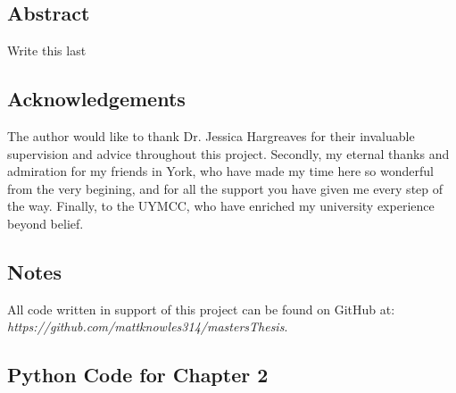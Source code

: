 \documentclass[11pt]{report}
\begin{document}


\section*{Abstract}
Write this last

\section*{Acknowledgements}
The author would like to thank Dr. Jessica Hargreaves for their invaluable supervision and advice throughout this project. Secondly, my eternal thanks and admiration for my friends in York, who have made my time here so wonderful from the very begining, and for all the support you have given me every step of the way. Finally, to the UYMCC, who have enriched my university experience beyond belief. 

\section*{Notes}
All code written in support of this project can be found on GitHub at: \\
\textit{https://github.com/mattknowles314/mastersThesis}.

\tableofcontents















{}


\begin{appendices}
    \chapter{Python Code for Chapter 2}
    
\end{appendices}
\end{document}
